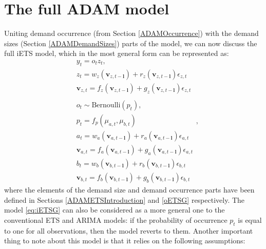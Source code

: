 \documentclass[
]{book}
\theoremstyle{definition}
\theoremstyle{definition}
\theoremstyle{definition}
\theoremstyle{definition}
\theoremstyle{remark}
\begin{document}
\hypertarget{ADAMIntermittentFull}{%
\section{The full ADAM model}\label{ADAMIntermittentFull}}

Uniting demand occurrence (from Section \ref{ADAMOccurrence}) with the demand sizes (Section \ref{ADAMDemandSizes}) parts of the model, we can now discuss the full iETS model, which in the most general form can be represented as:
\begin{equation}
    \begin{aligned}
        & y_t = o_t z_t , \\
        & {z}_{t} = w_z(\mathbf{v}_{z,t-\mathbf{l}}) + r_z(\mathbf{v}_{z,t-\mathbf{l}}) \epsilon_{z,t} \\
        & \mathbf{v}_{z,t} = f_z(\mathbf{v}_{z,t-\mathbf{l}}) + g_z(\mathbf{v}_{z,t-\mathbf{l}}) \epsilon_{z,t} \\
        & \\
        & o_t \sim \text{Bernoulli} \left(p_t \right) , \\
        & p_t = f_p(\mu_{a,t}, \mu_{b,t}) \\
        & a_t = w_a(\mathbf{v}_{a,t-\mathbf{l}}) + r_a(\mathbf{v}_{a,t-\mathbf{l}}) \epsilon_{a,t} \\
        & \mathbf{v}_{a,t} = f_a(\mathbf{v}_{a,t-\mathbf{l}}) + g_a(\mathbf{v}_{a,t-\mathbf{l}}) \epsilon_{a,t} \\
        & b_t = w_b(\mathbf{v}_{b,t-\mathbf{l}}) + r_b(\mathbf{v}_{b,t-\mathbf{l}}) \epsilon_{b,t} \\
        & \mathbf{v}_{b,t} = f_b(\mathbf{v}_{b,t-\mathbf{l}}) + g_b(\mathbf{v}_{b,t-\mathbf{l}}) \epsilon_{b,t}
    \end{aligned} ,
  \label{eq:iETSG}
\end{equation}
where the elements of the demand size and demand occurrence parts have been defined in Sections \ref{ADAMETSIntroduction} and \ref{oETSG} respectively. The model \eqref{eq:iETSG} can also be considered as a more general one to the conventional ETS and ARIMA models: if the probability of occurrence \(p_t\) is equal to one for all observations, then the model reverts to them. Another important thing to note about this model is that it relies on the following assumptions:
\end{document}
